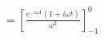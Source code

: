 \documentclass[preview]{standalone}
\begin{document}
\begin{align*}
&=\left[\frac{e^{-i\omega t}(1+i\omega t)}{\omega^{2}}\right]_{-1}^{0} \\
\end{align*}
\end{document}
